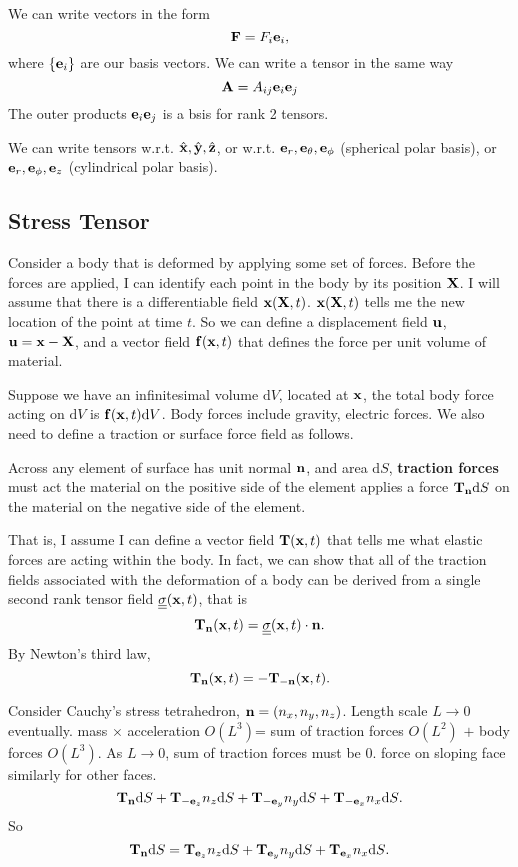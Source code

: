 \documentclass[12pt]{article}
\newcommand{\xx}{{\bf x}}
\newcommand{\ee}{{\bf e}}
\newcommand{\ff}{{\bf f}}
\newcommand{\nn}{{\bf n}}
\newcommand{\uu}{{\bf u}}
\newcommand{\FF}{{\bf F}}
\newcommand{\bA}{{\bf A}}
\newcommand{\bX}{{\bf X}}
\newcommand{\bT}{{\bf T}}
\newcommand{\ssigma}{{\underline{\underline \sigma}}}
\newcommand{\dV}{{\text{d}V}}
\newcommand{\dS}{{\text{d}S}}
\begin{document}
We can write vectors in the form
\[
\FF = F_i\ee_i,
\]
where $\{\ee_i\}$ are our basis vectors. We can write a tensor in the same way
\[
\bA = A_{ij}\ee_i\ee_j
\]
The outer products $\ee_i\ee_j$ is a bsis for rank 2 tensors.

We can write tensors w.r.t. $\hat\xx, \hat{\bf y}, \hat{\bf z}$, or w.r.t. $\ee_r, \ee_{\theta}, \ee_{\phi}$ (spherical polar basis), or  $\ee_r, \ee_{\phi}, \ee_{z}$ (cylindrical polar basis).



\subsection{Stress Tensor}
Consider a body that is deformed by applying some set of forces. Before the forces are applied, I can identify each point in the body by its position $\bX$. I will assume that there is a differentiable field $\xx (\bX,t)$. $\xx (\bX,t)$ tells me the new location of the point at time $t$. So we can define a displacement field $\uu$, $\uu = \xx-\bX$, and a vector field $\ff(\xx,t)$ that defines the force per unit volume of material. 

Suppose we have an infinitesimal volume $\dV$, located at $\xx$, the total body force acting on $\dV$ is $\ff(\xx,t)\dV$. Body forces include gravity, electric forces. We also need to define a traction or surface force field as follows. 

Across any element of surface has unit normal $\nn$, and area $\dS$,  {\bf traction forces} must act the material on the positive side of the element applies a force $\bT_{\nn}\dS$ on the material on the negative side of the element.

That is, I assume I can define a vector field $\bT(\xx, t)$ that tells me what elastic forces are acting within the body. In fact, we can show that all of the traction fields associated with the deformation of a body can be derived from a single second rank tensor field $\ssigma(\xx,t)$, that is
\[
\bT_{\nn}(\xx,t) = \ssigma(\xx,t)\cdot \nn .
\]
By Newton's third law,
\[
\bT_{\nn}(\xx,t) = -\bT_{-\nn}(\xx,t).
\]

Consider Cauchy's stress tetrahedron, $\nn = (n_x, n_y, n_z)$. Length scale $L\to 0$ eventually.
mass $\times$ acceleration $O(L^3)$= sum of traction forces $O(L^2)$ $+$ body forces $O(L^3)$. As $L\to 0$, sum of traction forces must be 0.  force on sloping face
similarly for other faces.
\[
\bT_{\nn}\dS + \bT_{-\ee_z}n_z\dS +\bT_{-\ee_y}n_y\dS +\bT_{-\ee_x}n_x\dS .
\]
So 
\[
\bT_{\nn}\dS = \bT_{\ee_z}n_z\dS +\bT_{\ee_y}n_y\dS +\bT_{\ee_x}n_x\dS .
\]
\end{document}
